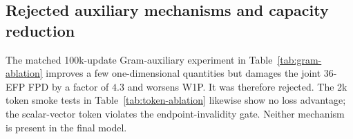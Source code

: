 \documentclass[10pt]{article}
\newcommand{\Log}{\operatorname{Log}}
\begin{document}
\begin{table}[H]
\centering
\caption{Matched 994k-update gluon-30 coupling/readout runs. ``Physical'' uses
coefficients from $(h^L,y^L)$ but directions from $\Log_{x_i}(x_j)$; ``latent'' uses
$y_j^L-y_i^L$ for the directions.}
\label{tab:icp-ablation}
\end{table}

\subsection{Rejected auxiliary mechanisms and capacity reduction}

The matched 100k-update Gram-auxiliary experiment in
Table~\ref{tab:gram-ablation} improves a few one-dimensional quantities but damages the
joint 36-EFP FPD by a factor of $4.3$ and worsens W1P. It was therefore rejected. The
2k token smoke tests in Table~\ref{tab:token-ablation} likewise show no loss advantage;
the scalar-vector token violates the endpoint-invalidity gate. Neither mechanism is
present in the final model.

\begin{table}[H]
\centering
\caption{Matched gluon-30 auxiliary-objective ablation at 100k updates. Historical
FPND is omitted because these runs predate the corrected input convention.}
\label{tab:gram-ablation}
\end{table}
\end{document}

